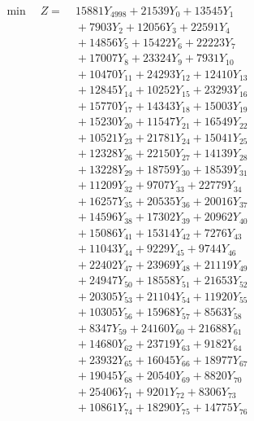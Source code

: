 \documentclass[a4paper,10pt]{article}
\begin{document}
\allowdisplaybreaks
{\small
\begin{align}
\min \quad Z = &\; 15881 Y_{4998} + 21539 Y_{0} + 13545 Y_{1} \\[0.3ex]
&\;  + 7903 Y_{2} + 12056 Y_{3} + 22591 Y_{4} \\[0.3ex]
&\;  + 14856 Y_{5} + 15422 Y_{6} + 22223 Y_{7} \\[0.3ex]
&\;  + 17007 Y_{8} + 23324 Y_{9} + 7931 Y_{10} \\[0.3ex]
&\;  + 10470 Y_{11} + 24293 Y_{12} + 12410 Y_{13} \\[0.3ex]
&\;  + 12845 Y_{14} + 10252 Y_{15} + 23293 Y_{16} \\[0.3ex]
&\;  + 15770 Y_{17} + 14343 Y_{18} + 15003 Y_{19} \\[0.3ex]
&\;  + 15230 Y_{20} + 11547 Y_{21} + 16549 Y_{22} \\[0.3ex]
&\;  + 10521 Y_{23} + 21781 Y_{24} + 15041 Y_{25} \\[0.3ex]
&\;  + 12328 Y_{26} + 22150 Y_{27} + 14139 Y_{28} \\[0.5ex]\allowbreak
&\;  + 13228 Y_{29} + 18759 Y_{30} + 18539 Y_{31} \\[0.3ex]
&\;  + 11209 Y_{32} + 9707 Y_{33} + 22779 Y_{34} \\[0.3ex]
&\;  + 16257 Y_{35} + 20535 Y_{36} + 20016 Y_{37} \\[0.3ex]
&\;  + 14596 Y_{38} + 17302 Y_{39} + 20962 Y_{40} \\[0.3ex]
&\;  + 15086 Y_{41} + 15314 Y_{42} + 7276 Y_{43} \\[0.3ex]
&\;  + 11043 Y_{44} + 9229 Y_{45} + 9744 Y_{46} \\[0.3ex]
&\;  + 22402 Y_{47} + 23969 Y_{48} + 21119 Y_{49} \\[0.3ex]
&\;  + 24947 Y_{50} + 18558 Y_{51} + 21653 Y_{52} \\[0.3ex]
&\;  + 20305 Y_{53} + 21104 Y_{54} + 11920 Y_{55} \\[0.3ex]
&\;  + 10305 Y_{56} + 15968 Y_{57} + 8563 Y_{58} \\[0.5ex]\allowbreak
&\;  + 8347 Y_{59} + 24160 Y_{60} + 21688 Y_{61} \\[0.3ex]
&\;  + 14680 Y_{62} + 23719 Y_{63} + 9182 Y_{64} \\[0.3ex]
&\;  + 23932 Y_{65} + 16045 Y_{66} + 18977 Y_{67} \\[0.3ex]
&\;  + 19045 Y_{68} + 20540 Y_{69} + 8820 Y_{70} \\[0.3ex]
&\;  + 25406 Y_{71} + 9201 Y_{72} + 8306 Y_{73} \\[0.3ex]
&\;  + 10861 Y_{74} + 18290 Y_{75} + 14775 Y_{76} \\[0.3ex]

\end{align}}
\end{document}
